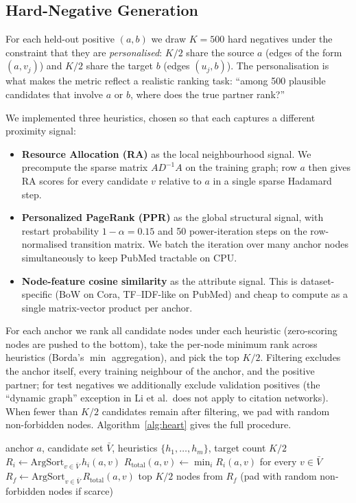\documentclass[10pt,a4paper]{article}
\begin{document}
\subsection{Hard-Negative Generation}
\label{sec:hard-negatives}

For each held-out positive $(a, b)$ we draw $K=500$ hard negatives
under the constraint that they are \emph{personalised}: $K/2$ share
the source $a$ (edges of the form $(a, v_j)$) and $K/2$ share the
target $b$ (edges $(u_j, b)$). The personalisation is what makes the
metric reflect a realistic ranking task: ``among 500 plausible
candidates that involve $a$ or $b$, where does the true partner rank?''

We implemented three heuristics, chosen so that each captures a
different proximity signal:
\begin{itemize}
\item \textbf{Resource Allocation (RA)} as the local neighbourhood
  signal. We precompute the sparse matrix $A D^{-1} A$ on the training
  graph; row $a$ then gives RA scores for every candidate $v$ relative
  to $a$ in a single sparse Hadamard step.
\item \textbf{Personalized PageRank (PPR)} as the global structural
  signal, with restart probability $1 - \alpha = 0.15$ and 50
  power-iteration steps on the row-normalised transition matrix. We
  batch the iteration over many anchor nodes simultaneously to keep
  PubMed tractable on CPU.
\item \textbf{Node-feature cosine similarity} as the attribute signal.
  This is dataset-specific (BoW on Cora, TF--IDF-like on PubMed) and
  cheap to compute as a single matrix-vector product per anchor.
\end{itemize}

For each anchor we rank all candidate nodes under each heuristic
(zero-scoring nodes are pushed to the bottom), take the per-node
minimum rank across heuristics (Borda's $\min$ aggregation), and pick
the top $K/2$. Filtering excludes the anchor itself, every training
neighbour of the anchor, and the positive partner; for test negatives
we additionally exclude validation positives (the ``dynamic graph''
exception in Li et al.\ does not apply to citation networks). When
fewer than $K/2$ candidates remain after filtering, we pad with random
non-forbidden nodes. Algorithm~\ref{alg:heart} gives the full
procedure.

\begin{algorithm}[t]
\caption{Hard-negative generation for a single anchor $a$.}
\label{alg:heart}
\begin{algorithmic}[1]
\Require anchor $a$, candidate set $\bar V$, heuristics $\{h_1, \ldots, h_m\}$, target count $K/2$
  \State $R_i \gets \mathrm{ArgSort}_{v \in \bar V}\, h_i(a, v)$ 
\EndFor
\State $R_{\mathrm{total}}(a, v) \gets \min_i R_i(a, v)$ for every $v \in \bar V$
\State $R_f \gets \mathrm{ArgSort}_{v \in \bar V}\, R_{\mathrm{total}}(a, v)$
\State \Return top $K/2$ nodes from $R_f$ (pad with random non-forbidden nodes if scarce)
\end{algorithmic}
\end{algorithm}
\end{document}
